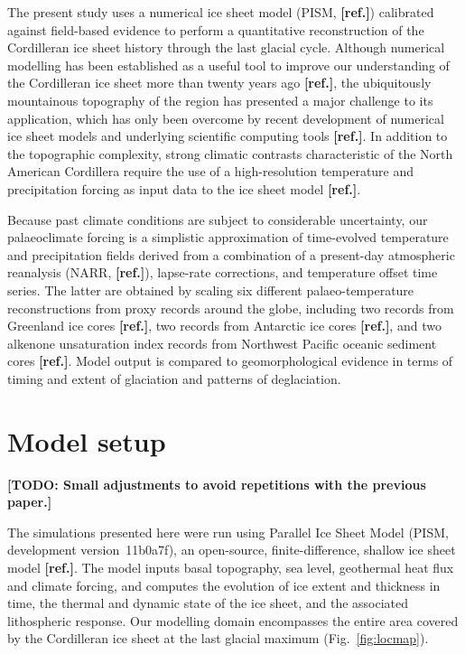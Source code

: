 \documentclass[tc, ms]{copernicus}
\newcommand{\todo}[1]{\textbf{[TODO: #1]}}
\newcommand{\aref}[0]{\textbf{[ref.]}}
\begin{document}
The present study uses a numerical ice sheet model (PISM, \aref) calibrated against
field-based evidence to perform a quantitative reconstruction of the
Cordilleran ice sheet history through the last glacial cycle. Although
numerical modelling has been established as a useful tool to improve our
understanding
of the Cordilleran ice sheet more than twenty years ago \aref, the ubiquitously
mountainous topography of the region has presented a major challenge to its
application, which has only been overcome by recent development of numerical ice
sheet models and underlying scientific computing tools \aref. In addition to the topographic
complexity, strong climatic contrasts characteristic of the North American
Cordillera require the use of a high-resolution temperature and precipitation
forcing as input data to the ice sheet model \aref.

Because past climate conditions are subject to considerable uncertainty, our
palaeoclimate forcing is a simplistic approximation of time-evolved temperature
and precipitation fields derived from a combination of a present-day
atmospheric reanalysis (NARR, \aref), lapse-rate corrections,
and temperature offset time series. The latter are
obtained by scaling six different palaeo-temperature reconstructions from
proxy records around the globe, including two  records from
Greenland ice cores \aref, two  records from Antarctic ice cores \aref,
and two alkenone unsaturation index records from Northwest Pacific oceanic
sediment cores \aref. Model output is compared to geomorphological evidence in terms
of timing and extent of glaciation and patterns of deglaciation.


\section{Model setup}
\label{sec:model}

\todo{Small adjustments to avoid repetitions with the previous paper.}

The simulations presented here were run using Parallel Ice Sheet Model (PISM,
development version~11b0a7f), an open-source, finite-difference, shallow ice
sheet model \aref. The model inputs basal topography, sea level, geothermal
heat flux and climate forcing, and computes the evolution of ice extent
and thickness in time, the thermal and dynamic state of the ice sheet, and
the associated lithospheric response. Our modelling domain encompasses the
entire area covered by the Cordilleran ice sheet at the last glacial maximum
(Fig.~\ref{fig:locmap}).
\end{document}
